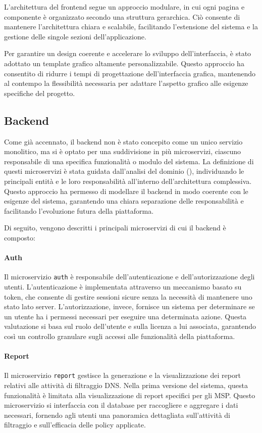 L'architettura del frontend segue un approccio modulare, in cui ogni pagina e componente è organizzato secondo una struttura gerarchica. Ciò consente di mantenere l'architettura chiara e scalabile, facilitando l'estensione del sistema e la gestione delle singole sezioni dell'applicazione.

Per garantire un design coerente e accelerare lo sviluppo dell'interfaccia, è stato adottato un template grafico altamente personalizzabile. Questo approccio ha consentito di ridurre i tempi di progettazione dell’interfaccia grafica, mantenendo al contempo la flessibilità necessaria per adattare l’aspetto grafico alle esigenze specifiche del progetto.

\subsection{Backend}
Come già accennato, il backend non è stato concepito come un unico servizio monolitico, ma si è optato per una suddivisione in più microservizi, ciascuno responsabile di una specifica funzionalità o modulo del sistema. La definizione di questi microservizi è stata guidata dall'analisi del dominio (), individuando le principali entità e le loro responsabilità all'interno dell'architettura complessiva. Questo approccio ha permesso di modellare il backend in modo coerente con le esigenze del sistema, garantendo una chiara separazione delle responsabilità e facilitando l'evoluzione futura della piattaforma.

Di seguito, vengono descritti i principali microservizi di cui il backend è composto:
\paragraph{Auth}
Il microservizio \texttt{auth} è responsabile dell'autenticazione e dell'autorizzazione degli utenti. L'autenticazione è implementata attraverso un meccanismo basato su token, che consente di gestire sessioni sicure senza la necessità di mantenere uno stato lato server.
L'autorizzazione, invece, fornisce un sistema per determinare se un utente ha i permessi necessari per eseguire una determinata azione. Questa valutazione si basa sul ruolo dell'utente e sulla licenza a lui associata, garantendo così un controllo granulare sugli accessi alle funzionalità della piattaforma.

\paragraph{Report}
Il microservizio \texttt{report} gestisce la generazione e la visualizzazione dei report relativi alle attività di filtraggio DNS. Nella prima versione del sistema, questa funzionalità è limitata alla visualizzazione di report specifici per gli MSP. Questo microservizio si interfaccia con il database per raccogliere e aggregare i dati necessari, fornendo agli utenti una panoramica dettagliata sull'attività di filtraggio e sull'efficacia delle policy applicate.


